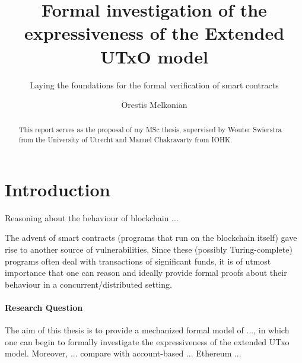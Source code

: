 \documentclass[acmsmall,nonacm=true,screen=true]{acmart}\settopmatter{printfolios=false,printccs=false,printacmref=false}
\begin{document}
\title{Formal investigation of the expressiveness of the Extended UTxO model}
\subtitle{Laying the foundations for the formal verification of smart contracts}

\author{Orestis Melkonian}

\begin{abstract}
This report serves as the proposal of my MSc thesis, supervised by Wouter Swierstra from the
University of Utrecht and Manuel Chakravarty from IOHK.
\end{abstract}

\maketitle

\section{Introduction}
\label{sec:intro}

Reasoning about the behaviour of blockchain ...


The advent of smart contracts (programs that run on the blockchain itself) gave
rise to another source of vulnerabilities. Since these (possibly Turing-complete)
programs often deal with transactions of significant funds,
it is of utmost importance that one can reason and ideally provide formal proofs
about their behaviour in a concurrent/distributed setting.

\paragraph{Research Question}
The aim of this thesis is to provide a mechanized formal model of ...,
in which one can begin to formally investigate the expressiveness
of the extended UTxo model.
Moreover, ... compare with account-based ... Ethereum ...
\end{document}
